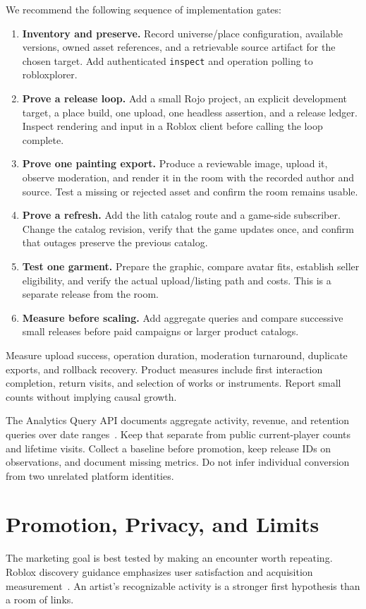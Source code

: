 \documentclass[10pt,letterpaper,twocolumn]{article}
\begin{document}
We recommend the following sequence of implementation gates:
\begin{enumerate}
\item \textbf{Inventory and preserve.} Record universe/place configuration, available versions, owned asset references, and a retrievable source artifact for the chosen target. Add authenticated \texttt{inspect} and operation polling to robloxplorer.
\item \textbf{Prove a release loop.} Add a small Rojo project, an explicit development target, a place build, one upload, one headless assertion, and a release ledger. Inspect rendering and input in a Roblox client before calling the loop complete.
\item \textbf{Prove one painting export.} Produce a reviewable image, upload it, observe moderation, and render it in the room with the recorded author and source. Test a missing or rejected asset and confirm the room remains usable.
\item \textbf{Prove a refresh.} Add the lith catalog route and a game-side subscriber. Change the catalog revision, verify that the game updates once, and confirm that outages preserve the previous catalog.
\item \textbf{Test one garment.} Prepare the graphic, compare avatar fits, establish seller eligibility, and verify the actual upload/listing path and costs. This is a separate release from the room.
\item \textbf{Measure before scaling.} Add aggregate queries and compare successive small releases before paid campaigns or larger product catalogs.
\end{enumerate}

Measure upload success, operation duration, moderation turnaround, duplicate exports, and rollback recovery. Product measures include first interaction completion, return visits, and selection of works or instruments. Report small counts without implying causal growth.

The Analytics Query API documents aggregate activity, revenue, and retention queries over date ranges~\cite{analytics}. Keep that separate from public current-player counts and lifetime visits. Collect a baseline before promotion, keep release IDs on observations, and document missing metrics. Do not infer individual conversion from two unrelated platform identities.

\section{Promotion, Privacy, and Limits}
The marketing goal is best tested by making an encounter worth repeating. Roblox discovery guidance emphasizes user satisfaction and acquisition measurement~\cite{discovery}. An artist's recognizable activity is a stronger first hypothesis than a room of links.
\end{document}
